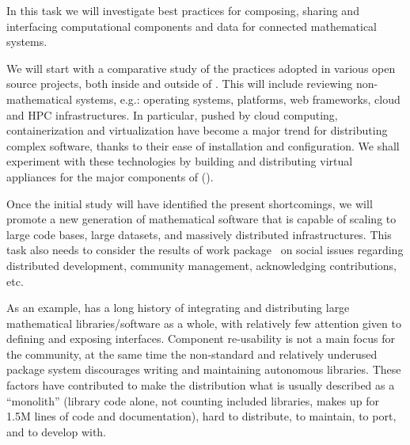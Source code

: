 \begin{workpackage}[id=component-architecture,wphases=0-48!.5,
  title=Component Architecture,lead=UV,
  PSRM=24,UVRM=8,SARM=16, USHRM=4, USORM=6]
\begin{tasklist}
  \begin{task}[title=Modularization and packaging,id=mod-packaging,lead=UV,PM=32]




    In this task we will investigate best practices for composing,
    sharing and interfacing computational components and data for
    connected mathematical systems.

    We will start with a comparative study of the practices adopted in
    various open source projects, both inside and outside of
    \TheProject. This will include reviewing non-mathematical systems,
    e.g.: operating systems, platforms, web frameworks, cloud and HPC
    infrastructures.  In particular, pushed by cloud computing,
    containerization and virtualization have become a major trend for
    distributing complex software, thanks to their ease of
    installation and configuration. We shall experiment with these
    technologies by building and distributing virtual appliances for
    the major components of \TheProject
    ().

    Once the initial study will have identified the present
    shortcomings, we will promote a new generation of mathematical
    software that is capable of scaling to large code bases, large
    datasets, and massively distributed infrastructures. This task
    also needs to consider the results of work
    package~ on social issues regarding
    distributed development, community management, acknowledging
    contributions, etc.

    As an example, \Sage has a long history of integrating and
    distributing large mathematical libraries/software as a whole,
    with relatively few attention given to defining and exposing
    interfaces. Component re-usability is not a main focus for the
    \Sage community, at the same time the non-standard and relatively
    underused package system discourages writing and maintaining
    autonomous libraries. These factors have contributed to make the
    \Sage distribution what is usually described as a ``monolith''
    (\Sage library code alone, not counting included libraries, makes
    up for 1.5M lines of code and documentation), hard to distribute,
    to maintain, to port, and to develop with.


\end{task}
\end{tasklist}
\end{workpackage}
